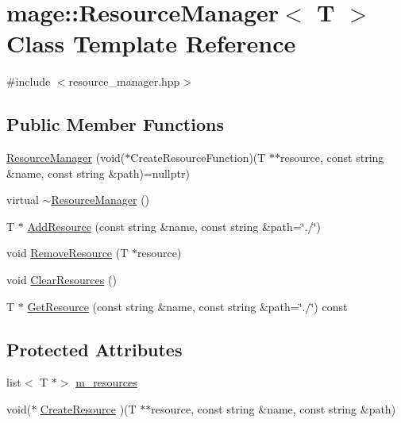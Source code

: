 \hypertarget{classmage_1_1_resource_manager}{}\section{mage\+:\+:Resource\+Manager$<$ T $>$ Class Template Reference}
\label{classmage_1_1_resource_manager}


{\ttfamily \#include $<$resource\+\_\+manager.\+hpp$>$}

\subsection*{Public Member Functions}
\begin{DoxyCompactItemize}
\item 
\hyperlink{classmage_1_1_resource_manager_a175c64e73c941c161b2ee0df80fc5492}{Resource\+Manager} (void($\ast$Create\+Resource\+Function)(T $\ast$$\ast$resource, const string \&name, const string \&path)=nullptr)
\item 
virtual \hyperlink{classmage_1_1_resource_manager_af3b6bf56e57bd3df0eb569510dd1483b}{$\sim$\+Resource\+Manager} ()
\item 
T $\ast$ \hyperlink{classmage_1_1_resource_manager_a358d8bcb9a0812cc69ff1e8cd8234988}{Add\+Resource} (const string \&name, const string \&path=\char`\"{}./\char`\"{})
\item 
void \hyperlink{classmage_1_1_resource_manager_ab10959337c87b6454209b5116478cc21}{Remove\+Resource} (T $\ast$resource)
\item 
void \hyperlink{classmage_1_1_resource_manager_a875ea647ed1d475ca2d3f39dc492215b}{Clear\+Resources} ()
\item 
T $\ast$ \hyperlink{classmage_1_1_resource_manager_a448a25bbe7ff37a88d1b19d50744d7ee}{Get\+Resource} (const string \&name, const string \&path=\char`\"{}./\char`\"{}) const
\end{DoxyCompactItemize}
\subsection*{Protected Attributes}
\begin{DoxyCompactItemize}
\item 
list$<$ T $\ast$$>$ \hyperlink{classmage_1_1_resource_manager_ab058f7127d317bfe78b9f391a4351315}{m\+\_\+resources}
\item 
void($\ast$ \hyperlink{classmage_1_1_resource_manager_a1175cdd82a5407dd099b53a432ca9a95}{Create\+Resource} )(T $\ast$$\ast$resource, const string \&name, const string \&path)
\end{DoxyCompactItemize}


